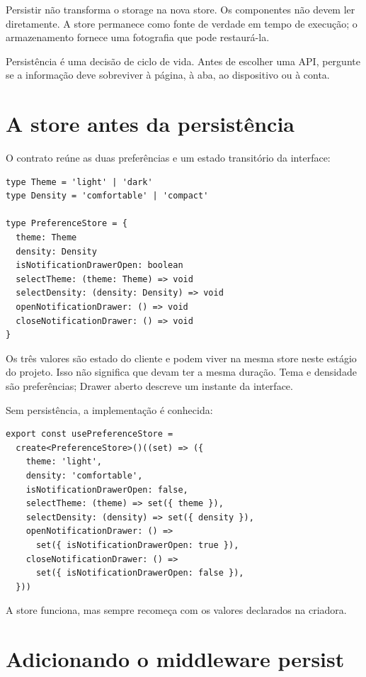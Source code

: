 Persistir não transforma o storage na nova store. Os componentes não devem ler
 diretamente. A store permanece como fonte de verdade em
tempo de execução; o armazenamento fornece uma fotografia que pode restaurá-la.

\begin{decisao}
Persistência é uma decisão de ciclo de vida. Antes de escolher uma API, pergunte
se a informação deve sobreviver à página, à aba, ao dispositivo ou à conta.
\end{decisao}

\section{A store antes da persistência}

O contrato reúne as duas preferências e um estado transitório da interface:

\begin{lstlisting}[caption={Preferências e Drawer possuem ciclos de vida diferentes.}]
type Theme = 'light' | 'dark'
type Density = 'comfortable' | 'compact'

type PreferenceStore = {
  theme: Theme
  density: Density
  isNotificationDrawerOpen: boolean
  selectTheme: (theme: Theme) => void
  selectDensity: (density: Density) => void
  openNotificationDrawer: () => void
  closeNotificationDrawer: () => void
}
\end{lstlisting}

Os três valores são estado do cliente e podem viver na mesma store neste estágio
do projeto. Isso não significa que devam ter a mesma duração. Tema e densidade
são preferências; Drawer aberto descreve um instante da interface.

Sem persistência, a implementação é conhecida:

\begin{lstlisting}
export const usePreferenceStore =
  create<PreferenceStore>()((set) => ({
    theme: 'light',
    density: 'comfortable',
    isNotificationDrawerOpen: false,
    selectTheme: (theme) => set({ theme }),
    selectDensity: (density) => set({ density }),
    openNotificationDrawer: () =>
      set({ isNotificationDrawerOpen: true }),
    closeNotificationDrawer: () =>
      set({ isNotificationDrawerOpen: false }),
  }))
\end{lstlisting}

A store funciona, mas sempre recomeça com os valores declarados na criadora.

\section{Adicionando o middleware persist}

